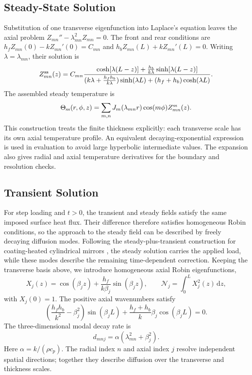 \documentclass{optica-article}
\newcommand{\dd}{\,\mathrm{d}}
\begin{document}
\subsection{Steady-State Solution}
Substitution of one transverse eigenfunction into Laplace's equation leaves the axial problem $Z_{mn}''-\lambda_{mn}^2Z_{mn}=0$.
The front and rear conditions are $h_fZ_{mn}(0)-kZ_{mn}'(0)=C_{mn}$ and $h_bZ_{mn}(L)+kZ_{mn}'(L)=0$.
Writing $\lambda=\lambda_{mn}$, their solution is
\begin{equation}
 Z_{mn}^{\rm ss}(z)=C_{mn}\frac{\cosh[\lambda(L-z)]+\frac{h_b}{k\lambda}\sinh[\lambda(L-z)]}
 {(k\lambda+\frac{h_fh_b}{k\lambda})\sinh(\lambda L)+(h_f+h_b)\cosh(\lambda L)}.
 \label{eq:steadyaxial}
\end{equation}
The assembled steady temperature is
\begin{equation}
 \Theta_{\rm ss}(r,\phi,z)=\sum_{m,n}J_m(\lambda_{mn}r)\cos(m\phi)Z_{mn}^{\rm ss}(z).
 \label{eq:steady}
\end{equation}
This construction treats the finite thickness explicitly: each transverse scale has its own axial temperature profile.
An equivalent decaying-exponential expression is used in evaluation to avoid large hyperbolic intermediate values.
The expansion also gives radial and axial temperature derivatives for the boundary and resolution checks.

\subsection{Transient Solution}\label{sec:transient}
For step loading and $t>0$, the transient and steady fields satisfy the same imposed surface heat flux.
Their difference therefore satisfies homogeneous Robin conditions, so the approach to the steady field can be described by freely decaying diffusion modes.
Following the steady-plus-transient construction for coating-heated cylindrical mirrors \cite{hellovinet1990}, the steady solution carries the applied load, while these modes describe the remaining time-dependent correction.
Keeping the transverse basis above, we introduce homogeneous axial Robin eigenfunctions,
\begin{equation}
 X_j(z)=\cos(\beta_jz)+\frac{h_f}{k\beta_j}\sin(\beta_jz),\qquad
 \mathcal N_j=\int_0^L X_j^2(z)\dd z,
 \label{eq:axialmodes}
\end{equation}
with $X_j(0)=1$.
The positive axial wavenumbers satisfy
\begin{equation}
 \left(\frac{h_fh_b}{k^2}-\beta_j^2\right)\sin(\beta_jL)
  +\frac{h_f+h_b}{k}\beta_j\cos(\beta_jL)=0.
 \label{eq:axialroots}
\end{equation}
The three-dimensional modal decay rate is
\begin{equation}
 d_{mnj}=\alpha(\lambda_{mn}^2+\beta_j^2).
 \label{eq:rate}
\end{equation}
Here $\alpha=k/(\rho c_p)$.
The radial index $n$ and axial index $j$ resolve independent spatial directions; together they describe diffusion over the transverse and thickness scales.
\end{document}
